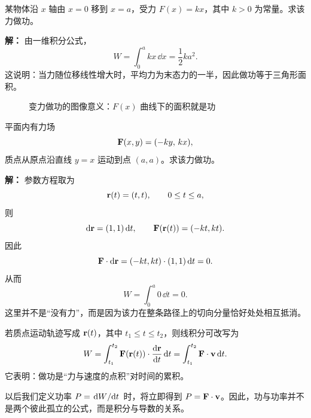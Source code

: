 \begin{example}\label{ex:linear-force-work}
某物体沿 $x$ 轴由 $x=0$ 移到 $x=a$，受力 $F(x)=kx$，其中 $k>0$ 为常量。求该力做功。

\textbf{解：}
由一维积分公式，
\[
W=\int_0^a kx\,\dd x = \frac{1}{2}ka^2.
\]
这说明：当力随位移线性增大时，平均力为末态力的一半，因此做功等于三角形面积。
\end{example}

\begin{figure}[htbp]
\centering
{}
\caption{变力做功的图像意义：$F(x)$ 曲线下的面积就是功}
\end{figure}

\begin{example}[二维路径上的线积分]
平面内有力场
\[
\vb{F}(x,y)=(-ky,\,kx),
\]
质点从原点沿直线 $y=x$ 运动到点 $(a,a)$。求该力做功。

\textbf{解：}
参数方程取为
\[
\vb{r}(t)=(t,t),\qquad 0\le t\le a,
\]
则
\[
\dd \vb{r}=(1,1)\,\dd t,
\qquad
\vb{F}(\vb{r}(t))=(-kt,kt).
\]
因此
\[
\vb{F}\cdot \dd \vb{r}=(-kt,kt)\cdot (1,1)\,\dd t = 0.
\]
从而
\[
W=\int_0^a 0\,\dd t =0.
\]
这里并不是“没有力”，而是因为该力在整条路径上的切向分量恰好处处相互抵消。
\end{example}

\begin{definition}[变力做功的微积分表述]
若质点运动轨迹写成 $\vb{r}(t)$，其中 $t_1\le t\le t_2$，则线积分可改写为
\[
W=\int_{t_1}^{t_2} \vb{F}(\vb{r}(t))\cdot \dv{\vb{r}}{t}\,\dd t
=\int_{t_1}^{t_2} \vb{F}\cdot \vb{v}\,\dd t.
\]
它表明：做功是“力与速度的点积”对时间的累积。
\end{definition}

\begin{remark}
以后我们定义功率 $P=\dv*{W}{t}$ 时，将立即得到 $P=\vb{F}\cdot \vb{v}$。因此，功与功率并不是两个彼此孤立的公式，而是积分与导数的关系。
\end{remark}

